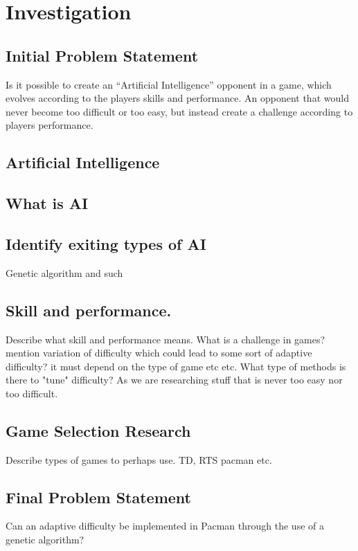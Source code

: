 \section{Investigation} \label{sec:preanalysus}

\subsection{Initial Problem Statement} \label{sec:initialproblemstatement}
Is it possible to create an “Artificial Intelligence” opponent in a game, which evolves according to the players skills and performance.  An opponent that would never become too difficult or too easy, but instead create a challenge according to players performance.


\subsection{Artificial Intelligence} \label{sec:ai}
\subsection{What is AI}
\subsection{Identify exiting types of AI}
Genetic algorithm and such
\subsection{Skill and performance.}
Describe what skill and performance means. What is a challenge in games?
mention variation of difficulty which could lead to some sort of adaptive difficulty? it must depend on the type of game etc etc.
What type of methods is there to "tune" difficulty? As we are researching stuff that is never too easy nor too difficult.
\subsection{Game Selection Research}
Describe types of games to perhaps use. TD, RTS pacman etc.


\subsection{Final Problem Statement} \label{sec:finalproblemstatement}
Can an adaptive difficulty 	be implemented in Pacman through the use of a genetic algorithm?